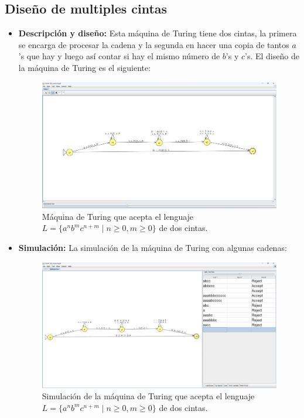 \documentclass[11pt]{report}
\begin{document}
\subsection{Diseño de multiples cintas}
\begin{itemize}
  \item \textbf{Descripción y diseño:} Esta máquina de Turing tiene dos cintas, la primera se encarga de procesar la cadena y la segunda en hacer una copia de tantos $a$'s que hay y luego así contar si hay el mismo número de $b$'s y $c$'s. El diseño de la máquina de Turing es el siguiente:

        \begin{figure}[H]
          \centering
          \includegraphics[scale=0.3]{img/MT_02_multiple_ribbon.png}
          \caption{Máquina de Turing que acepta el lenguaje $L = \{a^nb^mc^{n+m} \mid n \geq 0, m \geq 0\}$ de dos cintas.}
          \label{fig:maquina de turing que acepta el lenguaje L = {a^nb^mc^{n+m} | n >= 0, m >= 0}}
        \end{figure}

        \newpage

  \item \textbf{Simulación:} La simulación de la máquina de Turing con algunas cadenas:
        \begin{figure}[H]
          \centering
          \includegraphics[scale=0.3]{img/MT_02_multiple_ribbon_simulation.png}
          \caption{Simulación de la máquina de Turing que acepta el lenguaje $L = \{a^nb^mc^{n+m} \mid n \geq 0, m \geq 0\}$ de dos cintas.}
          \label{fig:simulacion de la maquina de turing que acepta el lenguaje L = {a^nb^mc^{n+m} | n >= 0, m >= 0}}
        \end{figure}


\end{itemize}
\end{document}
